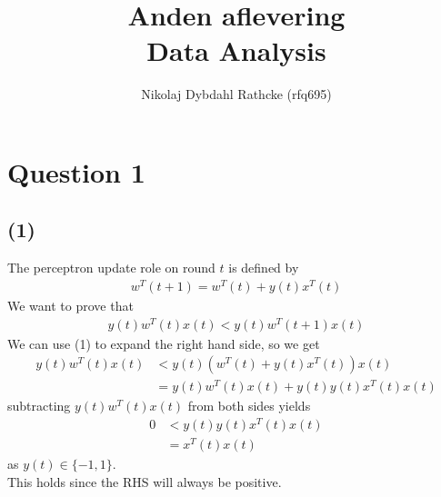 \documentclass[a4paper]{article}
\author{Nikolaj Dybdahl Rathcke (rfq695)}
\title{Anden aflevering \\ Data Analysis}
\begin{document}
\maketitle
\section*{Question 1}
\subsection*{(1)}
The perceptron update role on round $t$ is defined by
\begin{align}
w^T(t+1)=w^T(t)+y(t)x^T(t)
\end{align}
We want to prove that
\begin{align*}
y(t)w^T(t)x(t)<y(t)w^T(t+1)x(t)
\end{align*}
We can use (1) to expand the right hand side, so we get
\begin{align*}
y(t)w^T(t)x(t)&<y(t)(w^T(t)+y(t)x^T(t))x(t) \\
&=y(t)w^T(t)x(t)+y(t)y(t)x^T(t)x(t)
\end{align*}
subtracting $y(t)w^T(t)x(t)$ from both sides yields
\begin{align*}
0&<y(t)y(t)x^T(t)x(t) \\
&=x^T(t)x(t)
\end{align*}
as $y(t)\in \{-1,1\}$. \\
This holds since the RHS will always be positive.
\end{document}

